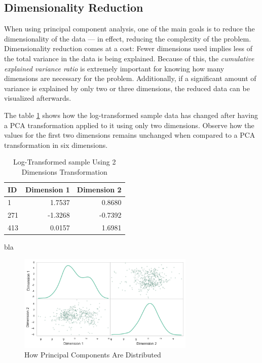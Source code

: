 \documentclass[a4paper]{article}
\begin{document}
\subsection{Dimensionality Reduction}

When using principal component analysis, one of the main goals is to reduce the dimensionality of the data — in effect, reducing the complexity of the problem. Dimensionality reduction comes at a cost: Fewer dimensions used implies less of the total variance in the data is being explained. Because of this, the \textit{cumulative explained variance ratio} is extremely important for knowing how many dimensions are necessary for the problem. Additionally, if a significant amount of variance is explained by only two or three dimensions, the reduced data can be visualized afterwards.

The table \ref{tab:sample_transformed_2} shows how the log-transformed sample data has changed after having a PCA transformation applied to it using only two dimensions. Observe how the values for the first two dimensions remains unchanged when compared to a PCA transformation in six dimensions.

\begin{table}[ht!]
\centering
\begin{tabular}{l|rr}
{ID} &  Dimension 1 &  Dimension 2 \\\hline
1 &       1.7537 &       0.8680 \\
271 &      -1.3268 &      -0.7392 \\
413 &       0.0157 &       1.6981 \\

\end{tabular}
\caption{\label{tab:sample_transformed_2}Log-Transformed sample Using 2 Dimensions Transformation}
\end{table}

bla 

\begin{figure}[ht!]
\centering
\includegraphics[width=0.75\textwidth]{figures/scatter_after_pca.png}
\caption{\label{fig:scatter_pca}How Principal Components Are Distributed}
\end{figure}
\end{document}
